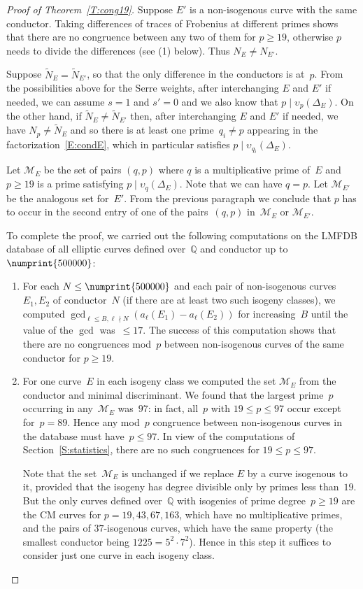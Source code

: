 \documentclass[twoside,leqno,symbols-for-thanks, draft]{rmi}
\numberwithin{equation}{section}
\newcommand{\Q}{\mathbb{Q}}
\newcommand{\calM}{\mathcal{M}}
\newcommand{\vv}{\upsilon}
\theoremstyle{remark}
\begin{document}
\begin{proof}[Proof of Theorem~\ref{T:cong19}]
Suppose $E'$ is a non-isogenous curve with the same conductor. Taking differences of traces of Frobenius at different primes shows that 
there are no congruence between any two of them for $p \geq 19$, otherwise $p$ needs to divide the differences (see (1) below). 
Thus $N_E \neq N_{E'}$.

Suppose $\tilde{N}_E = \tilde{N}_{E'}$, so that the only difference in the conductors is at~$p$. From the possibilities above for the Serre weights, after interchanging $E$ and $E'$ if needed, 
we can assume $s=1$ and $s'=0$ and we also know that $p \mid \vv_p(\Delta_E)$. On the other hand, if $\tilde{N}_E \neq \tilde{N}_{E'}$ then, after interchanging $E$ and $E'$ if needed, we have $N_p \neq \tilde{N}_E$ and so there is at least one prime~$q_i \neq p$ appearing in the factorization~\eqref{E:condE}, which in particular satisfies $p \mid \vv_{q_i}(\Delta_E)$.

Let $\calM_E$ be the set of pairs $(q,p)$ where $q$ is a multiplicative prime of~$E$ and
$p \geq 19$ is a prime satisfying $p \mid \vv_{q}(\Delta_E)$.
Note that we can have $q=p$. Let $\calM_{E'}$ be the analogous set for~$E'$. From the previous paragraph we conclude that 
$p$ has to occur in the second entry of one of the pairs~$(q,p)$ in~$\calM_E$ or $\calM_{E'}$.

To complete the proof, we carried out the following computations on
the LMFDB database of all elliptic curves defined over~$\Q$ and
conductor up to~$\numprint{500000}$:
\begin{enumerate}
\item For each $N\le \numprint{500000}$ and each pair of non-isogenous
  curves~$E_1,E_2$ of conductor~$N$ (if there are at least two such
  isogeny classes), we computed $\gcd_{\ell\le B,
    \ell\nmid N}(a_{\ell}(E_1)-a_{\ell}(E_2))$ for increasing~$B$
  until the value of the $\gcd$ was~${}\le17$.  The success of this
  computation shows that there are no congruences mod~$p$ between
  non-isogenous curves of the same conductor for $p\ge19$.
\item For one curve~$E$ in each isogeny class we computed the set
  $\calM_E$ from the conductor and minimal discriminant.  We found that
  the largest prime~$p$ occurring in any~$\calM_E$ was~$97$: in fact,
  all~$p$ with $19\le p\le97$ occur except for~$p=89$.  Hence any
  mod~$p$ congruence between non-isogenous curves in the database must
  have~$p\le97$.  In view of the computations of
  Section~\ref{S:statistics}, there are no such congruences for $19\le
  p\le97$.

  Note that the set~$\calM_E$ is unchanged if we replace $E$ by a curve
  isogenous to it, provided that the isogeny has degree divisible only
  by primes less than~$19$.  But the only curves defined over~$\Q$ with
  isogenies of prime degree~$p\ge19$ are the CM curves for
  $p=19,43,67,163$, which have no multiplicative primes, and the pairs
  of $37$-isogenous curves, which have the same property (the smallest
  conductor being $1225=5^2\cdot7^2$).  Hence in this step it suffices
  to consider just one curve in each isogeny class.
\end{enumerate}
\end{proof}
\end{document}
